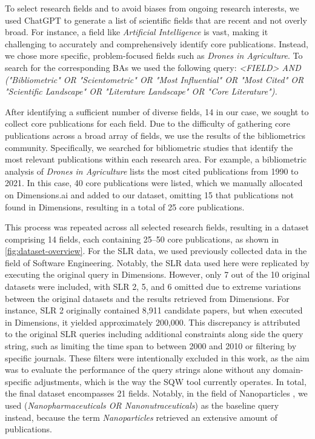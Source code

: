 To select research fields and to avoid biases from ongoing research interests, we used ChatGPT to generate a list of scientific fields that are recent and not overly broad. For instance, a field like \textit{Artificial Intelligence} is vast, making it challenging to accurately and comprehensively identify core publications. Instead, we chose more specific, problem-focused fields such as \textit{Drones in Agriculture}. To search for the corresponding BAs we used the following query: \textit{<FIELD> AND ("Bibliometric" OR "Scientometric" OR "Most Influential" OR "Most Cited" OR "Scientific Landscape" OR "Literature Landscape" OR "Core Literature").} 

After identifying a sufficient number of diverse fields, 14 in our case, we sought to collect core publications for each field. Due to the difficulty of gathering core publications across a broad array of fields, we use the results of the bibliometrics community. Specifically, we searched for bibliometric studies that identify the most relevant publications within each research area. For example, a bibliometric analysis of \textit{Drones in Agriculture} \autocite{Rejeb2022} lists the most cited publications from 1990 to 2021. In this case, 40 core publications were listed, which we manually allocated on Dimensions.ai and added to our dataset, omitting 15 that publications not found in Dimensions, resulting in a total of 25 core publications. 

This process was repeated across all selected research fields, resulting in a dataset comprising 14 fields, each containing 25–50 core publications, as shown in \autoref{fig:dataset-overview}. For the SLR data, we used previously collected data \autocite{badami2023adaptive} in the field of Software Engineering. Notably, the SLR data used here were replicated by executing the original query in Dimensions. However, only 7 out of the 10 original datasets were included, with SLR 2, 5, and 6 omitted due to extreme variations between the original datasets and the results retrieved from Dimensions. For instance, SLR 2 originally contained 8,911 candidate papers, but when executed in Dimensions, it yielded approximately 200,000. This discrepancy is attributed to the original SLR queries including additional constraints along side the query string, such as limiting the time span to between 2000 and 2010 or filtering by specific journals. These filters were intentionally excluded in this work, as the aim was to evaluate the performance of the query strings alone without any domain-specific adjustments, which is the way the SQW tool currently operates. In total, the final dataset encompasses 21 fields. Notably, in the field of Nanoparticles \autocite{Yeung2020}, we used (\textit{Nanopharmaceuticals OR Nanonutraceuticals}) as the baseline query instead, because the term \textit{Nanoparticles} retrieved an extensive amount of publications.

